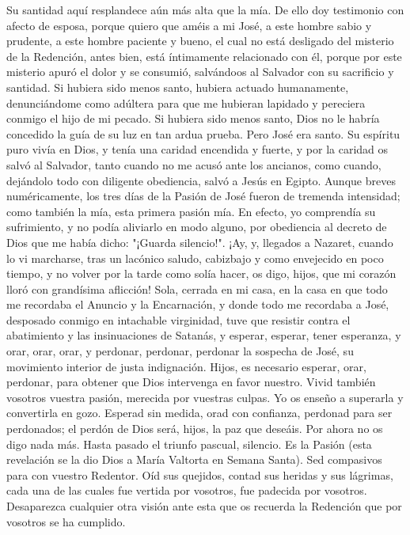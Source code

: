 \documentclass[12pt]{book} %
\begin{document}
Su santidad aquí resplandece aún más alta que la mía. De ello doy testimonio con afecto de esposa, porque quiero que 
améis a mi José, a este hombre sabio y prudente, a este hombre paciente y bueno, el cual no está desligado del misterio de la Redención, antes bien, está íntimamente relacionado con él, porque por este misterio apuró el dolor y se consumió, salvándoos al Salvador con su sacrificio y santidad. 
Si hubiera sido menos santo, hubiera actuado humanamente, denunciándome como adúltera para que me hubieran 
lapidado y pereciera conmigo el hijo de mi pecado. Si hubiera sido menos santo, Dios no le habría concedido la guía de su luz en tan ardua prueba. Pero José era santo. Su espíritu puro vivía en Dios, y tenía una caridad encendida y fuerte, y por la caridad os salvó al Salvador, tanto cuando no me acusó ante los ancianos, como cuando, dejándolo todo con diligente obediencia, salvó a Jesús en Egipto. 
Aunque breves numéricamente, los tres días de la Pasión de José fueron de tremenda intensidad; como también la mía, esta primera pasión mía. En efecto, yo comprendía su sufrimiento, y no podía aliviarlo en modo alguno, por obediencia al decreto de Dios que me había dicho: "¡Guarda silencio!". 
¡Ay, y, llegados a Nazaret, cuando lo vi marcharse, tras un lacónico saludo, cabizbajo y como envejecido en poco 
tiempo, y no volver por la tarde como solía hacer, os digo, hijos, que mi corazón lloró con grandísima aflicción! Sola, cerrada en mi casa, en la casa en que todo me recordaba el Anuncio y la Encarnación, y donde todo me recordaba a José, desposado conmigo en intachable virginidad, tuve que resistir contra el abatimiento y las insinuaciones de Satanás, y esperar, esperar, tener esperanza, y orar, orar, orar, y perdonar, perdonar, perdonar la sospecha de José, su movimiento interior de justa indignación.                            
Hijos, es necesario esperar, orar, perdonar, para obtener que Dios intervenga en favor nuestro. Vivid también vosotros vuestra pasión, merecida por vuestras culpas. Yo os enseño a superarla y convertirla en gozo. Esperad sin medida, orad con confianza, perdonad para ser perdonados; el perdón de Dios será, hijos, la paz que deseáis. 
Por ahora no os digo nada más. Hasta pasado el triunfo pascual, silencio. Es la Pasión (esta revelación se la dio Dios a María Valtorta en Semana Santa). Sed compasivos para con vuestro Redentor. Oíd sus quejidos, contad sus heridas y sus lágrimas, cada una de las cuales fue vertida por vosotros, fue padecida por vosotros. Desaparezca cualquier otra visión ante esta que os recuerda la Redención que por vosotros se ha cumplido. 
 
\end{document}
